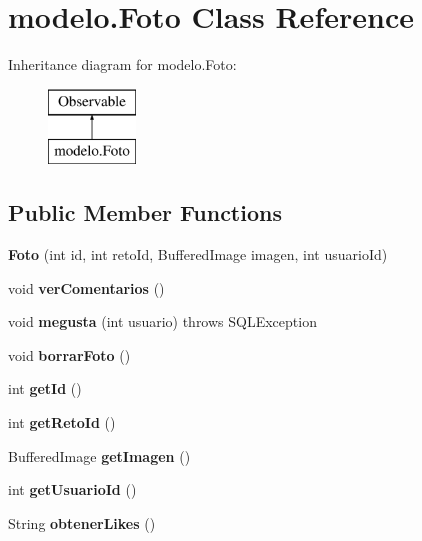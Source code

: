 \hypertarget{classmodelo_1_1_foto}{}\section{modelo.\+Foto Class Reference}
\label{classmodelo_1_1_foto}
Inheritance diagram for modelo.\+Foto\+:\begin{figure}[H]
\begin{center}
\leavevmode
\includegraphics[height=2.000000cm]{classmodelo_1_1_foto}
\end{center}
\end{figure}
\subsection*{Public Member Functions}
\begin{DoxyCompactItemize}
\item 
\mbox{\label{classmodelo_1_1_foto_a4ae8adb7dd9fd3cec9a8773232f66a1d}} 
{\bfseries Foto} (int id, int reto\+Id, Buffered\+Image imagen, int usuario\+Id)
\item 
\mbox{\label{classmodelo_1_1_foto_a9b0059a5f5b4dfddd3361da5479c4fae}} 
void {\bfseries ver\+Comentarios} ()
\item 
\mbox{\label{classmodelo_1_1_foto_a829de9aa94b0955e74c40d227e5c301a}} 
void {\bfseries megusta} (int usuario)  throws S\+Q\+L\+Exception 
\item 
\mbox{\label{classmodelo_1_1_foto_a35904c75dd74f11b2551af25ab3e98d1}} 
void {\bfseries borrar\+Foto} ()
\item 
\mbox{\label{classmodelo_1_1_foto_ae92de210d35310e441ac83f66f856017}} 
int {\bfseries get\+Id} ()
\item 
\mbox{\label{classmodelo_1_1_foto_a499b7f4c02e897250fd5706a5f54faa8}} 
int {\bfseries get\+Reto\+Id} ()
\item 
\mbox{\label{classmodelo_1_1_foto_a1c1a774410b574bd94023b050089277d}} 
Buffered\+Image {\bfseries get\+Imagen} ()
\item 
\mbox{\label{classmodelo_1_1_foto_a5233c028ac855ccf38d0de3c97c64152}} 
int {\bfseries get\+Usuario\+Id} ()
\item 
\mbox{\label{classmodelo_1_1_foto_a53afa33e0df03c6ed782a2cfe6d52112}} 
String {\bfseries obtener\+Likes} ()
\end{DoxyCompactItemize}
